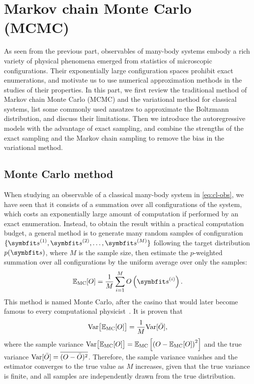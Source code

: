 \chapter{Markov chain Monte Carlo (MCMC)}

As seen from the previous part, observables of many-body systems embody a rich variety of physical phenomena emerged from statistics of microscopic configurations. Their exponentially large configuration spaces prohibit exact enumerations, and motivate us to use numerical approximation methods in the studies of their properties. In this part, we first review the traditional method of Markov chain Monte Carlo (MCMC) and the variational method for classical systems, list some commonly used ansatzes to approximate the Boltzmann distribution, and discuss their limitations. Then we introduce the autoregressive models with the advantage of exact sampling, and combine the strengths of the exact sampling and the Markov chain sampling to remove the bias in the variational method.

\section{Monte Carlo method}

When studying an observable of a classical many-body system in \cref{eq:cl-obs}, we have seen that it consists of a summation over all configurations of the system, which costs an exponentially large amount of computation if performed by an exact enumeration. Instead, to obtain the result within a practical computation budget, a general method is to generate many random samples of configuration $\{\vs^{(1)}, \vs^{(2)}, \ldots, \vs^{(M)}\}$ following the target distribution $p(\vs)$, where $M$ is the sample size, then estimate the $p$-weighted summation over all configurations by the uniform average over only the samples:
\begin{equation}
\bbE_\text{MC}[O] = \frac{1}{M} \sum_{i = 1}^M O\left( \vs^{(i)} \right).
\label{eq:monte-carlo}
\end{equation}
This method is named Monte Carlo, after the casino that would later become famous to every computational physicist~\cite{metropolis1949monte, landau2021guide1}. It is proven that~\cite{feller1968extention}
\begin{equation}
\mathrm{Var}\big[ \mathbb{E}_\text{MC}[O] \big] = \frac{1}{M} \mathrm{Var}[\bar{O}],
\label{eq:monte-carlo-var}
\end{equation}
where the sample variance $\mathrm{Var}\big[ \mathbb{E}_\text{MC}[O] \big] = \mathbb{E}_\text{MC}\left[ \left( O - \mathbb{E}_\text{MC}[O] \right)^2 \right]$ and the true variance $\mathrm{Var}[\bar{O}] = \overline{(O - \bar{O})^2}$. Therefore, the sample variance vanishes and the estimator converges to the true value as $M$ increases, given that the true variance is finite, and all samples are independently drawn from the true distribution.

